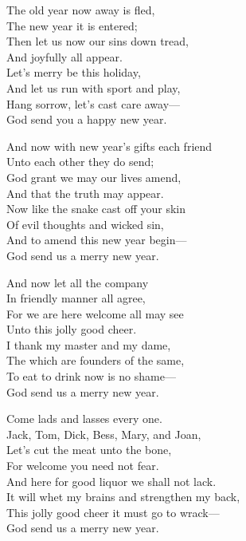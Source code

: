 \settowidth{\versewidth}{And now with new year’s gifts each friend}
\begin{dcverse}\begin{patverse}
The old year now away is fled,\\
The new year it is entered;\\
Then let us now our sins down tread,\\
And joyfully all appear.\\
Let’s merry be this holiday,\\
And let us run with sport and play,\\
Hang sorrow, let’s cast care away—\\
God send you a happy new year.
\end{patverse}

\begin{patverse}
And now with new year’s gifts each friend\\
Unto each other they do send;\\
God grant we may our lives amend,\\
And that the truth may appear.\\
Now like the snake cast off your skin\\
Of evil thoughts and wicked sin,\\
And to amend this new year begin—\\
God send us a merry new year.
\end{patverse}

\begin{patverse}
And now let all the company\\
In friendly manner all agree,\\
For we are here welcome all may see\\
Unto this jolly good cheer.\\
\columnbreak
I thank my master and my dame,\\
The which are founders of the same,\\
To eat to drink now is no shame—\\
God send us a merry new year.
\end{patverse}

\begin{patverse}
Come lads and lasses every one.\\
Jack, Tom, Dick, Bess, Mary, and Joan,\\
Let’s cut the meat unto the bone,\\
For welcome you need not fear.\\
And here for good liquor we shall not lack.\\
It will whet my brains and strengthen my back,\\
This jolly good cheer it must go to wrack—\\
God send us a merry new year.
\end{patverse}


\end{dcverse}
